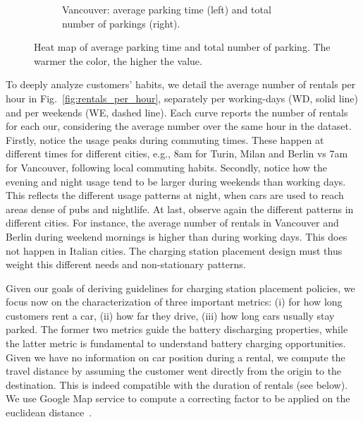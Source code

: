 \begin{figure}[t!]
\begin{center}
\begin{subfigure}{0.41\textwidth}
\begin{center}
            \captionsetup{justification=centering}
            \caption{Vancouver: average parking time (left) and total number of parkings (right).}
            \label{fig:heatmap_vancouver}
            \end{center}
        \end{subfigure}
          \caption{Heat map of average parking time and total number of parking. The warmer the color, the higher the value.}
         \label{fig:heatmaps}
\end{center}
\end{figure}

To deeply analyze customers' habits, we detail the average number of rentals per hour in Fig.~\ref{fig:rentals_per_hour}, separately per working-days (WD, solid line) and per weekends (WE, dashed line). Each curve reports the number of rentals for each our, considering the average number over the same hour in the dataset.
Firstly, notice the usage peaks during commuting times. These happen at different times for different cities, e.g., 8am for Turin, Milan and Berlin vs 7am for Vancouver, following local commuting habits. Secondly, notice how the evening and night usage tend to be larger during  weekends than working days. This reflects the different usage patterns at night, when cars are used to reach areas dense of pubs and nightlife.
At last, observe again the different patterns in different cities. For instance, the average number of rentals in Vancouver and Berlin during weekend mornings is higher than during working days. This does not happen in Italian cities. The charging station placement design must thus weight this different needs and non-stationary patterns.


Given our goals of deriving guidelines for charging station placement policies, we focus now on the characterization of three important metrics:
(i) for how long customers rent a car,
(ii) how far they drive,
(iii) how long cars usually stay parked.
The former two metrics guide the battery discharging properties, while the latter metric is fundamental to understand battery charging opportunities. Given we have no information on car position during a rental, we compute the travel distance by assuming the customer went directly from the origin to the destination. This is indeed compatible with the duration of rentals (see below). We use Google Map service to compute a correcting factor to be applied on the euclidean distance~\cite{UMAP}. 


